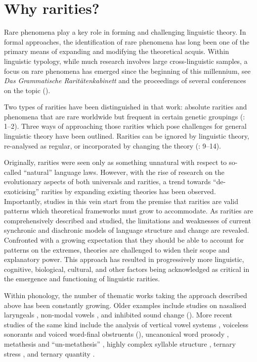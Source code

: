 \documentclass[output=paper]{langscibook}
\begin{document}
\section{Why rarities?}
\label{sec:Why-Rarities}

Rare phenomena play a key role in forming and challenging linguistic theory. In formal approaches, the identification of rare phenomena has long been one of the primary means of expanding and modifying the theoretical acquis. Within linguistic typology, while much research involves large cross-linguistic samples, a focus on rare phenomena has emerged since the beginning of this millennium, see \textit{Das Grammatische Raritätenkabinett} \citep{Plank2000} and the proceedings of several conferences on the topic (\citealt{WohlgemuthCysouw2010a,WohlgemuthCysouw2010b, SimonWiese2011, GolovkoEtAl2015}).

Two types of rarities have been distinguished in that work: absolute rarities and phenomena that are rare worldwide but frequent in certain genetic groupings (\citealt{WohlgemuthCysouw2010b}: 1–2). Three ways of approaching those rarities which pose challenges for general linguistic theory have been outlined. Rarities can be ignored by linguistic theory, re-analysed as regular, or incorporated by changing the theory (\citealt{SimonWiese2011}: 9–14).

Originally, rarities were seen only as something unnatural with respect to so-called “natural” language laws. However, with the rise of research on the evolutionary aspects of both universals and rarities, a trend towards “de-exoticising” rarities by expanding existing theories has been observed. Importantly, studies in this vein start from the premise that rarities are valid patterns which theoretical frameworks must grow to accommodate. As rarities are comprehensively described and studied, the limitations and weaknesses of current synchronic and diachronic models of language structure and change are revealed. Confronted with a growing expectation that they should be able to account for patterns on the extremes, theories are challenged to widen their scope and explanatory power. This approach has resulted in progressively more linguistic, cognitive, biological, cultural, and other factors being acknowledged as critical in the emergence and functioning of linguistic rarities.

Within phonology, the number of thematic works taking the approach described above has been constantly growing. Older examples include studies on nasalised laryngeals \citep{Blust1998}, non-modal vowels \citep{Gordon1998}, and inhibited sound change (\citealt{BlevinsWedel2009}). More recent studies of the same kind include the analysis of vertical vowel systems \citep{Anderson2016}, voiceless sonorants \citep{Blevins2018} and voiced word-final obstruents (\citealt{EgurtzegiUllrich2020}), uncanonical word prosody \citep{Kuznetsova2018}, metathesis and “un-metathesis” \citep{Edwards2020}, highly complex syllable structure \citep{Easterday2019}, ternary stress \citep{Golston2021}, and ternary quantity \citep{Kuznetsova_forth}.
\end{document}
